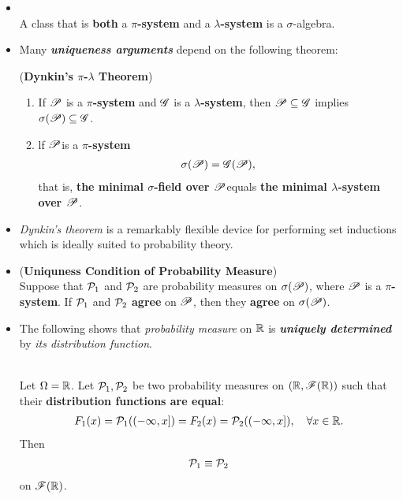 \documentclass[11pt]{article}
\begin{document}
\begin{itemize}
\item
\begin{lemma}\citep{resnick2013probability, billingsley2008probability}\\
A class that is \textbf{both} a \textbf{$\pi$-system} and a \textbf{$\lambda$-system} is a $\sigma$-algebra.
\end{lemma}

\item Many \emph{\textbf{uniqueness arguments}} depend on the following theorem:
\begin{theorem} (\textbf{Dynkin's $\pi$-$\lambda$ Theorem}) \citep{resnick2013probability, billingsley2008probability}
\begin{enumerate}
\item If ${\mathscr P}$ is a \textbf{$\pi$-system} and ${\mathscr G}$ is a \textbf{$\lambda$-system}, then ${\mathscr P} \subseteq {\mathscr G}$ implies $\sigma({\mathscr P}) \subseteq {\mathscr G}$.
\item lf ${\mathscr P}$is a \textbf{$\pi$-system}
\begin{align*}
\sigma({\mathscr P}) = {\mathscr G}({\mathscr P}),
\end{align*}
that is, \textbf{the minimal $\sigma$-field over ${\mathscr P}$}equals \textbf{the minimal $\lambda$-system over ${\mathscr P}$}.
\end{enumerate}
\end{theorem}

\item \begin{remark}
\emph{Dynkin's theorem} is a remarkably flexible device for performing set inductions which is ideally suited to probability theory.
\end{remark}

\item \begin{corollary} (\textbf{Uniquness Condition of Probability Measure}) \citep{resnick2013probability, billingsley2008probability}\\
Suppose that ${\mathcal P}_1$ and ${\mathcal P}_2$ are probability measures on $\sigma({\mathscr P})$, where ${\mathscr P}$ is a \textbf{$\pi$-system}. If ${\mathcal P}_1$ and ${\mathcal P}_2$ \textbf{agree} on ${\mathscr P}$, then they \textbf{agree} on $\sigma({\mathscr P})$.
\end{corollary}

\item The following shows that \emph{probability measure} on ${\mathbb R}$ is \emph{\textbf{uniquely determined}} by \emph{its distribution function}.
\begin{corollary}  \citep{resnick2013probability, billingsley2008probability}\\
Let $\Omega = {\mathbb R}$. Let ${\mathcal P}_1, {\mathcal P}_2$ be two probability measures on $({\mathbb R}, {\mathscr F}({\mathbb R}))$ such that their \textbf{distribution functions are equal}:
\begin{align*}
F_1(x) = {\mathcal P}_1((-\infty, x]) = F_2(x) = {\mathcal P}_2((-\infty, x]), \quad \forall x\in {\mathbb R}.
\end{align*}
Then 
\begin{align*}
{\mathcal P}_1 \equiv {\mathcal P}_2
\end{align*}
on ${\mathscr F}({\mathbb R})$.
\end{corollary}


\end{itemize}
\end{document}
